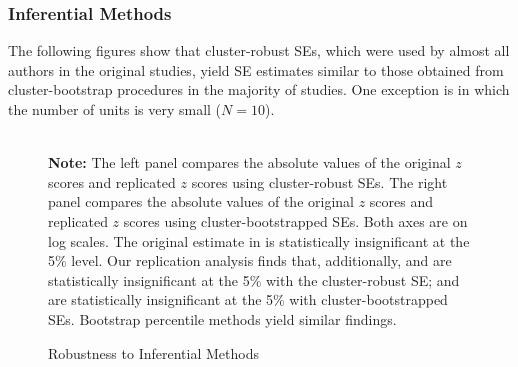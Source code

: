 \documentclass[12pt]{article}
\begin{document}
\clearpage

\subsubsection{Inferential Methods}

The following figures show that cluster-robust SEs, which were used by almost all authors in the original studies, yield SE estimates similar to those obtained from cluster-bootstrap procedures in the majority of studies. One exception is \cite{cox2021budgetary} in which the number of units is very small ($N = 10$).

\begin{figure}[!ht]
\caption{Robustness to Inferential Methods}\label{fg:infer_twfe}
\centering
\begin{minipage}{1\linewidth}{
\centering
\hspace{-1em}
\hspace{1em}
}\\
\footnotesize\textbf{Note:} The left panel compares the absolute values of the original $z$ scores and replicated $z$ scores using cluster-robust SEs. The right panel compares the absolute values of the original $z$ scores and replicated $z$ scores using cluster-bootstrapped SEs. Both axes are on log scales. The original estimate in \citet{Zhang2021jop} is statistically insignificant at the 5\% level. Our replication analysis finds that, additionally, \citet{eckhouse2022metrics} and  \citet{Grumbach2022} are statistically insignificant at the 5\% with the cluster-robust SE; \cite{Bischof2019} and  \citet{Blair2022} are statistically insignificant at the 5\% with cluster-bootstrapped SEs. Bootstrap percentile methods yield similar findings. 
\end{minipage}\vspace{-0.5em}
\end{figure}
\end{document}
